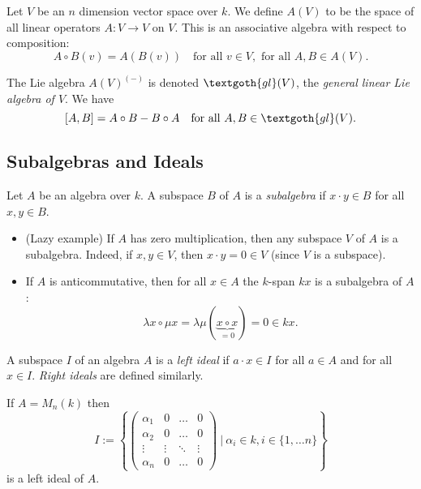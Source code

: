 \begin{definition}
	Let $V$ be an $n$ dimension vector space over $k$. We define $A(V)$ to be the space of all linear operators $A : V \to V$ on $V$. This is an associative algebra with respect to composition:
	\[
		A \circ B(v) = A(B(v)) \quad \text{for all } v \in V, \text{ for all } A, B \in A(V).
	\]
\end{definition}

\begin{definition}
	The Lie algebra $A(V)^{(-)}$ is denoted $\textgoth{gl}(V)$, the \emph{general linear Lie algebra of $V$}. We have
	\[
		[A, B] = A \circ B - B \circ A \quad \text{for all } A, B \in \textgoth{gl}(V).
	\]
\end{definition}

\subsection{Subalgebras and Ideals}
\begin{definition}
	Let $A$ be an algebra over $k$. A subspace $B$ of $A$ is a \emph{subalgebra} if $x \cdot y \in B$ for all $x, y \in B$.
\end{definition}

\begin{example}
	\begin{itemize}
		\item (Lazy example) If $A$ has zero multiplication, then any subspace $V$ of $A$ is a subalgebra. Indeed, if $x, y \in V$, then $x \cdot y = 0 \in V$ (since $V$ is a subspace).
		\item If $A$ is anticommutative, then for all $x \in A$ the $k$-span $kx$ is a subalgebra of $A$:
		\[
			\lambda x \circ \mu x = \lambda\mu(\underbrace{x \circ x}_{= 0}) = 0 \in kx.
		\]
	\end{itemize}
\end{example}

\begin{definition}
	A subspace $I$ of an algebra $A$ is a \emph{left ideal} if $a \cdot x \in I$ for all $a \in A$ and for all $x \in I$. \emph{Right ideals} are defined similarly.
\end{definition}

\begin{example}
	If $A = M_n(k)$ then
	\[
		I := \left\{
		\begin{pmatrix}
			\alpha_1 & 0 & \ldots & 0 \\
			\alpha_2 & 0 & \ldots & 0 \\
			\vdots	 & \vdots & \ddots & \vdots \\
			\alpha_n & 0 & \ldots & 0
		\end{pmatrix}
		\ |\ \alpha_i \in k, i \in \{1, \ldots n\}\right\}
	\]
	is a left ideal of $A$.
\end{example}
